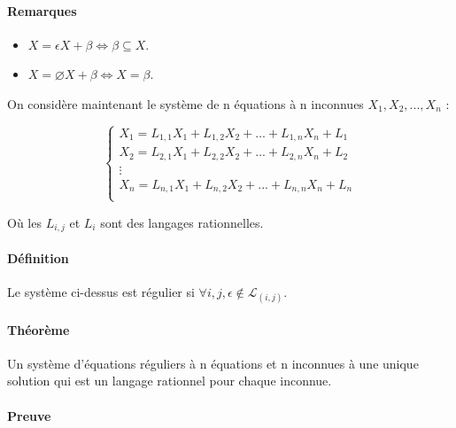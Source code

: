 

\paragraph{Remarques} %
\label{par:remarques}

\begin{itemize}
	\item $X = \epsilon X + \beta \Leftrightarrow \beta \subseteq X$.
	\item $X = \varnothing X + \beta \Leftrightarrow X = \beta$.
\end{itemize}


On considère maintenant le système de n équations à n inconnues $X_1, X_2, ..., X_n$ :

\[
   \left \{
   \begin{array}{cccc}
  		X_{1} = L_{1,1} X_1 + L_{1,2} X_2 + ... + L_{1,n} X_n + L_1\\
    	X_{2} = L_{2,1} X_1 + L_{2,2} X_2 + ... + L_{2,n} X_n + L_2\\
		\vdots\\
    	X_{n} = L_{n,1} X_1 + L_{n,2} X_2 + ... + L_{n,n} X_n + L_n\\
   \end{array}
   \right .
\]

Où les $L_{i,j}$ et $L_i$ sont des langages rationnelles.

\paragraph{Définition} %
\label{par:d_finition}

Le système ci-dessus est régulier si $\forall i,j, \epsilon \not \in \mathcal{L}_(i,j)$.



\paragraph{Théorème} %
\label{par:th_or_me}

Un système d'équations réguliers à n équations et n inconnues à une unique solution qui est un langage rationnel pour chaque inconnue.



\paragraph{Preuve} %
\label{par:preuve}

